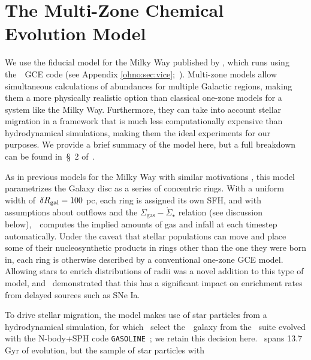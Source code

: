 
\section{The Multi-Zone Chemical Evolution Model}
\label{ohno:sec:multizone}

We use the fiducial model for the Milky Way published by
\citet{Johnson2021}, which runs using the~\vice~GCE code (see Appendix
\ref{ohno:sec:vice};~\citealp{Johnson2020, Griffith2021b}).
Multi-zone models allow simultaneous calculations of abundances for multiple
Galactic regions, making them a more physically realistic option than classical
one-zone models for a system like the Milky Way.
Furthermore, they can take into account stellar migration in a framework that
is much less computationally expensive than hydrodynamical simulations, making
them the ideal experiments for our purposes.
We provide a brief summary of the model here, but a full breakdown can be found
in~\S~2 of~\citet{Johnson2021}.
\par
As in previous models for the Milky Way with similar motivations
\citep[e.g.][]{Matteucci1989, Schoenrich2009a, Minchev2013, Minchev2014,
Minchev2017, Sharma2021}, this model parametrizes the Galaxy disc as a series
of concentric rings.
With a uniform width of~$\delta R_\text{gal} = 100$ pc, each ring is assigned its own
SFH, and with assumptions about outflows and the
$\Sigma_\text{gas}-\dot{\Sigma}_\star$ relation (see discussion
below),~\vice~computes the implied amounts of gas and infall at each timestep
automatically.
Under the caveat that stellar populations can move and place some of their
nucleosynthetic products in rings other than the one they were born in, each
ring is otherwise described by a conventional one-zone GCE model.
Allowing stars to enrich distributions of radii was a novel addition to this
type of model, and~\citet{Johnson2021} demonstrated that this has a
significant impact on enrichment rates from delayed sources such as SNe Ia.
\par
To drive stellar migration, the model makes use of star particles from a
hydrodynamical simulation, for which~\citet{Johnson2021} select the~\hsim~galaxy
from the~\citet{Christensen2012} suite evolved with the N-body+SPH code
\texttt{GASOLINE}~\citep{Wadsley2004}; we retain this decision here.
\hsim~spans 13.7 Gyr of evolution, but the sample of star particles with
